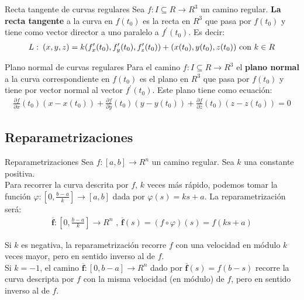 \documentclass[a4paper, twoside]{article}
\numberwithin{equation}{section}
\numberwithin{figure}{section}
\numberwithin{table}{section}
\newcommand{\vect}[1]{\overline{\textbf{#1}}}
\begin{document}
\begin{definicion*}{Recta tangente de curvas regulares}
	Sea $f:I\subseteq R \to R^3$ un camino regular. \textbf{La recta tangente} a la curva en $f(t_0)$ es la recta en $R^3$ que pasa por $f(t_0)$ y tiene como vector director a uno paralelo a $f^\prime(t_0)$. Es decir:
	\begin{align}
		L:\:(x,y,z)=k(f^\prime_x(t_0),f^\prime_y(t_0),f^\prime_z(t_0))+(x(t_0),y(t_0),z(t_0))\mbox{ con \ensuremath{k\in R}}
	\end{align}
\end{definicion*}

\begin{definicion*}{Plano normal de curvas regulares}
	Para el camino $f:I\subseteq R \to R^3$ el \textbf{plano normal} a la curva correspondiente en $f(t_0)$ es el plano en $R^3$ que pasa por $f(t_0)$ y tiene por vector normal al vector $f^\prime(t_0)$. Este plano tiene como ecuación:
	\begin{align}
		\frac{\partial f}{\partial x}(t_0)(x-x(t_0))+\frac{\partial f}{\partial y}(t_0)(y-y(t_0))+\frac{\partial f}{\partial z}(t_0)(z-z(t_0))=0
	\end{align}
\end{definicion*}

\subsection{Reparametrizaciones}
\begin{definicion*}{Reparametrizaciones}
	Sea $f:[a,b] \to R^n$ un camino regular. Sea $k$ una constante positiva.\\
	
	Para recorrer la curva descrita por $f$, $k$ veces más rápido, podemos tomar la función $\varphi:[0,\frac{b-a}{k}]\to[a,b]$ dada por $\varphi(s)=ks+a$. La reparametrización será:
	\begin{align}
		\vect{f}:[0,\frac{b-a}{k}] \to R^n \text{ , } \vect{f}(s)=(f\circ\varphi)(s)=f(ks+a)
	\end{align}
	
	Si $k$ es negativa, la reparametrización recorre $f$ con una velocidad en módulo $k$ veces mayor, pero en sentido inverso al de $f$.\\
	
	Si $k=-1$, el camino $\vect{f}:[0,b-a]\to R^n$ dado por $\vect{f}(s)=f(b-s)$ recorre la curva descripta por $f$ con la misma velocidad (en módulo) de $f$, pero en sentido inverso al de $f$.
\end{definicion*}
\end{document}
